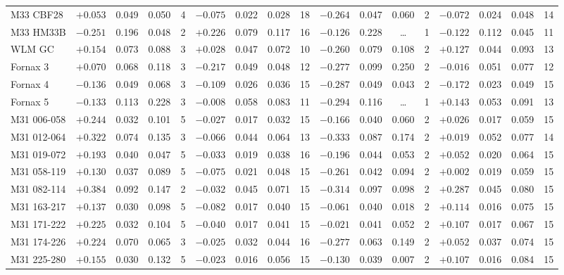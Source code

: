 \documentclass{aa}
\begin{document}
\begin{appendix}
\begin{table*}
\begin{adjustbox}{width=1\textwidth}
{\begin{tabular}{l cccccccccccccccc}
M33 CBF28     & $+0.053$ & 0.049 & 0.050 & 4 & $-0.075$ & 0.022 & 0.028 & 18 & $-0.264$ & 0.047 & 0.060 & 2 & $-0.072$ & 0.024 & 0.048 & 14 \\
M33 HM33B     & $-0.251$ & 0.196 & 0.048 & 2 & $+0.226$ & 0.079 & 0.117 & 16 & $-0.126$ & 0.228 & \ldots & 1 & $-0.122$ & 0.112 & 0.045 & 11 \\
WLM GC        & $+0.154$ & 0.073 & 0.088 & 3 & $+0.028$ & 0.047 & 0.072 & 10 & $-0.260$ & 0.079 & 0.108 & 2 & $+0.127$ & 0.044 & 0.093 & 13 \\
Fornax 3      & $+0.070$ & 0.068 & 0.118 & 3 & $-0.217$ & 0.049 & 0.048 & 12 & $-0.277$ & 0.099 & 0.250 & 2 & $-0.016$ & 0.051 & 0.077 & 12 \\
Fornax 4      & $-0.136$ & 0.049 & 0.068 & 3 & $-0.109$ & 0.026 & 0.036 & 15 & $-0.287$ & 0.049 & 0.043 & 2 & $-0.172$ & 0.023 & 0.049 & 15 \\
Fornax 5      & $-0.133$ & 0.113 & 0.228 & 3 & $-0.008$ & 0.058 & 0.083 & 11 & $-0.294$ & 0.116 & \ldots & 1 & $+0.143$ & 0.053 & 0.091 & 13 \\
M31 006-058   & $+0.244$ & 0.032 & 0.101 & 5 & $-0.027$ & 0.017 & 0.032 & 15 & $-0.166$ & 0.040 & 0.060 & 2 & $+0.026$ & 0.017 & 0.059 & 15 \\
M31 012-064   & $+0.322$ & 0.074 & 0.135 & 3 & $-0.066$ & 0.044 & 0.064 & 13 & $-0.333$ & 0.087 & 0.174 & 2 & $+0.019$ & 0.052 & 0.077 & 14 \\
M31 019-072   & $+0.193$ & 0.040 & 0.047 & 5 & $-0.033$ & 0.019 & 0.038 & 16 & $-0.196$ & 0.044 & 0.053 & 2 & $+0.052$ & 0.020 & 0.064 & 15 \\
M31 058-119   & $+0.130$ & 0.037 & 0.089 & 5 & $-0.075$ & 0.021 & 0.048 & 15 & $-0.261$ & 0.042 & 0.094 & 2 & $+0.002$ & 0.019 & 0.059 & 15 \\
M31 082-114   & $+0.384$ & 0.092 & 0.147 & 2 & $-0.032$ & 0.045 & 0.071 & 15 & $-0.314$ & 0.097 & 0.098 & 2 & $+0.287$ & 0.045 & 0.080 & 15 \\
M31 163-217   & $+0.137$ & 0.030 & 0.098 & 5 & $-0.082$ & 0.017 & 0.040 & 15 & $-0.061$ & 0.040 & 0.018 & 2 & $+0.114$ & 0.016 & 0.075 & 15 \\
M31 171-222   & $+0.225$ & 0.032 & 0.104 & 5 & $-0.040$ & 0.017 & 0.041 & 15 & $-0.021$ & 0.041 & 0.052 & 2 & $+0.107$ & 0.017 & 0.067 & 15 \\
M31 174-226   & $+0.224$ & 0.070 & 0.065 & 3 & $-0.025$ & 0.032 & 0.044 & 16 & $-0.277$ & 0.063 & 0.149 & 2 & $+0.052$ & 0.037 & 0.074 & 15 \\
M31 225-280   & $+0.155$ & 0.030 & 0.132 & 5 & $-0.023$ & 0.016 & 0.056 & 15 & $-0.130$ & 0.039 & 0.007 & 2 & $+0.107$ & 0.016 & 0.084 & 15 \\

\end{tabular}}
\end{adjustbox}
\end{table*}
\end{appendix}
\end{document}
